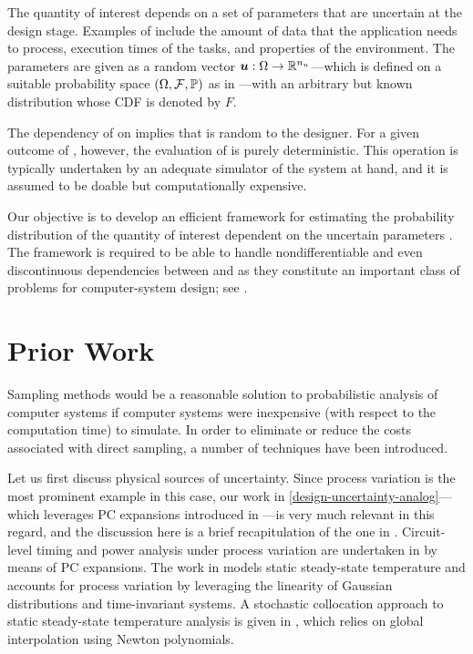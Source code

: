 The quantity of interest \g depends on a set of parameters \vu that are
uncertain at the design stage. Examples of \vu include the amount of data that
the application needs to process, execution times of the tasks, and properties
of the environment. The parameters \vu are given as a random vector $\boldsymbol{u}: \Omega
\to \mathbb{R}^{n_{u}}$---which is defined on a suitable probability space $(\Omega, \F,
\probability)$ as in ---with an arbitrary but known
distribution whose \ac{CDF} is denoted by $F$.

The dependency of \g on \vu implies that \g is random to the designer. For a
given outcome of \vu, however, the evaluation of \g is purely deterministic.
This operation is typically undertaken by an adequate simulator of the system at
hand, and it is assumed to be doable but computationally expensive.

Our objective is to develop an efficient framework for estimating the
probability distribution of the quantity of interest \g dependent on the
uncertain parameters \vu. The framework is required to be able to handle
nondifferentiable and even discontinuous dependencies between \g and \vu as they
constitute an important class of problems for computer-system design; see
.

\section{Prior Work}

Sampling methods would be a reasonable solution to probabilistic analysis of
computer systems if computer systems were inexpensive (with respect to the
computation time) to simulate. In order to eliminate or reduce the costs
associated with direct sampling, a number of techniques have been introduced.

Let us first discuss physical sources of uncertainty. Since process variation is
the most prominent example in this case, our work in
\cref{design-uncertainty-analog}---which leverages \ac{PC} expansions
\cite{xiu2010} introduced in ---is very much relevant in
this regard, and the discussion here is a brief recapitulation of the one in
. Circuit-level timing and power analysis under process
variation are undertaken in \cite{bhardwaj2008} by means of \ac{PC} expansions.
The work in \cite{juan2012} models static steady-state temperature and accounts
for process variation by leveraging the linearity of Gaussian distributions and
time-invariant systems. A stochastic collocation \cite{xiu2010} approach to
static steady-state temperature analysis is given in \cite{lee2013}, which
relies on global interpolation using Newton polynomials.

